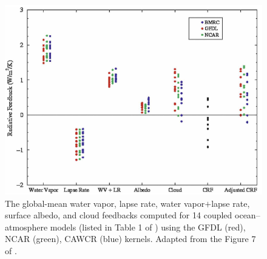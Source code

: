 \begin{figure}[tbhp] %
	\centering
	\includegraphics[width=.8\linewidth]{figs/polar_amp/fig7_Soden2008}
	\caption{The global-mean water vapor, lapse rate, water vapor$+$lapse rate, surface albedo, and cloud feedbacks computed for 14 coupled ocean–atmosphere models (listed in Table 1 of \cite{Soden2006}) using the GFDL (red), NCAR (green), CAWCR (blue) kernels. Adapted from the Figure 7 of \cite{Soden2008}.}
	\label{fig:soden2008_3_kernels}
\end{figure}

